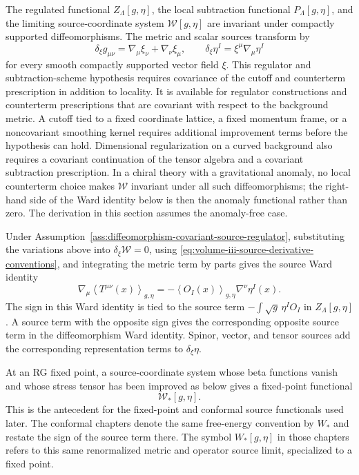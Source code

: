 \begin{assumption}
\label{ass:diffeomorphism-covariant-source-regulator}
The regulated functional \(Z_\Lambda[g,\eta]\), the local subtraction
functional \(P_\Lambda[g,\eta]\), and the limiting source-coordinate system
\(\mathcal W[g,\eta]\) are invariant under compactly supported
diffeomorphisms.
The metric and scalar sources transform by
\[
  \delta_\xi g_{\mu\nu}
  =
  \nabla_\mu\xi_\nu+\nabla_\nu\xi_\mu,
  \qquad
  \delta_\xi\eta^I
  =
  \xi^\mu\nabla_\mu\eta^I
\]
for every smooth compactly supported vector field \(\xi\).  This regulator and
subtraction-scheme hypothesis requires covariance of the cutoff and counterterm
prescription in addition to locality.  It is available for regulator
constructions and counterterm prescriptions that are covariant with respect to
the background metric.  A cutoff tied to a fixed coordinate lattice, a fixed
momentum frame, or a noncovariant smoothing kernel requires additional
improvement terms before the hypothesis can hold.
Dimensional regularization on a curved background also requires a covariant
continuation of the tensor algebra and a covariant subtraction prescription.
In a chiral theory with a gravitational anomaly, no local counterterm choice
makes \(\mathcal W\) invariant under all such diffeomorphisms; the right-hand
side of the Ward identity below is then the anomaly functional rather than
zero.  The derivation in this section assumes the anomaly-free case.
\end{assumption}

Under Assumption~\ref{ass:diffeomorphism-covariant-source-regulator},
substituting the variations above into \(\delta_\xi\mathcal W=0\), using
\eqref{eq:volume-iii-source-derivative-conventions}, and integrating the
metric term by parts gives the source Ward identity
\begin{equation}
  \nabla_\mu
  \left\langle T^{\mu\nu}(x)\right\rangle_{g,\eta}
  =
  -\left\langle O_I(x)\right\rangle_{g,\eta}
  \nabla^\nu\eta^I(x).
  \label{eq:volume-iii-source-diffeomorphism-ward}
\end{equation}
The sign in this Ward identity is tied to the source term
\(-\int\sqrt g\,\eta^I O_I\) in \(Z_\Lambda[g,\eta]\).  A source term with the
opposite sign gives the corresponding opposite source term in the
diffeomorphism Ward identity.
Spinor, vector, and tensor sources add the corresponding representation terms
to \(\delta_\xi\eta\).

At an RG fixed point, a source-coordinate system whose beta functions vanish and whose
stress tensor has been improved as below gives a fixed-point functional
\[
  \mathcal W_\ast[g,\eta].
\]
This is the antecedent for the fixed-point and conformal source functionals
used later.  The conformal chapters denote the same free-energy convention by
\(W_\ast\) and restate the sign of the source term there.  The symbol
\(W_\ast[g,\eta]\) in those chapters refers to this same renormalized metric and
operator source limit, specialized to a fixed point.

